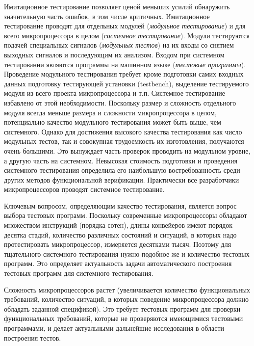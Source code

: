 {Имитационное тестирование позволяет ценой меньших усилий обнаружить значительную часть ошибок, в том числе критичных. Имитационное тестирование проводят для отдельных модулей (\emph{модульное тестирование}) и для всего микропроцессора в целом (\emph{системное тестирование}). Модули тестируются подачей специальных сигналов (\emph{модульных тестов}) на их входы со снятием выходных сигналов и последующим их анализом. Входом при системном тестировании являются программы на машинном языке (\emph{тестовые программы}). Проведение модульного тестирования требует кроме подготовки самих входных данных подготовку тестирующей установки (testbench), выделение тестируемого модуля из всего проекта микропроцессора и т.п. Системное тестирование избавлено от этой необходимости. Поскольку размер и сложность отдельного модуля всегда меньше размера и сложности микропроцессора в целом, потенциально качество модульного тестирования может быть выше, чем системного. Однако для достижения высокого качества тестирования как число модульных тестов, так и совокупная трудоемкость их изготовления, получаются очень большими. Это вынуждает часть проверок проводить на модульном уровне, а другую часть на системном. Невысокая стоимость подготовки и проведения системного тестирования определила его наибольшую востребованность среди других методов функциональной верификации. Практически все разработчики микропроцессоров проводят системное тестирование.

Ключевым вопросом, определяющим качество тестирования, является вопрос выбора тестовых программ. Поскольку современные микропроцессоры обладают множеством инструкций (порядка сотен), длины конвейеров имеют порядок десятка стадий, количество различных состояний и ситуаций, в которых надо протестировать микропроцессор, измеряется десятками тысяч. Поэтому для тщательного системного тестирования нужно подобное же и количество тестовых программ. Это определяет актуальность задачи автоматического построения тестовых программ для системного тестирования.

Сложность микропроцессоров растет (увеличивается количество функциональных требований, количество ситуаций, в которых поведение микропроцессора должно обладать заданной спецификой). Это требует тестовых программ для проверки функциональных требований, которые не проверяются имеющимися тестовыми программами, и делает актуальными дальнейшие исследования в области построения тестов.


}
